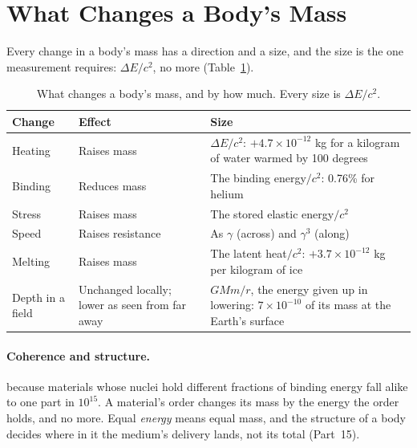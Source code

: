 \documentclass[11pt,a4paper]{article}
\begin{document}
\section{What Changes a Body's Mass}
\label{sec:changes}

Every change in a body's mass has a direction and a size, and the size is the one measurement requires: $\Delta E/c^2$, no more (Table~\ref{tab:changes}).

\begin{table}[H]
\centering
\small
\renewcommand{\arraystretch}{1.25}
\begin{tabular}{@{}>{\raggedright\arraybackslash}p{}>{\raggedright\arraybackslash}p{}>{\raggedright\arraybackslash}p{}@{}}
\toprule
\textbf{Change} & \textbf{Effect} & \textbf{Size} \\
\midrule
Heating & Raises mass & $\Delta E/c^2$: $+4.7\times10^{-12}$ kg for a kilogram of water warmed by 100 degrees \\
Binding & Reduces mass & The binding energy$/c^2$: 0.76\% for helium \\
Stress & Raises mass & The stored elastic energy$/c^2$ \\
Speed & Raises resistance & As $\gamma$ (across) and $\gamma^3$ (along) \\
Melting & Raises mass & The latent heat$/c^2$: $+3.7\times10^{-12}$ kg per kilogram of ice \\
Depth in a field & Unchanged locally; lower as seen from far away & $GMm/r$, the energy given up in lowering: $7\times10^{-10}$ of its mass at the Earth's surface \\
\bottomrule
\end{tabular}
\caption{What changes a body's mass, and by how much. Every size is $\Delta E/c^2$.}
\label{tab:changes}
\end{table}

\paragraph{Coherence and structure.}  because materials whose nuclei hold different fractions of binding energy fall alike to one part in $10^{15}$. A material's order changes its mass by the energy the order holds, and no more. Equal \emph{energy} means equal mass, and the structure of a body decides where in it the medium's delivery lands, not its total (Part 15).
\end{document}
